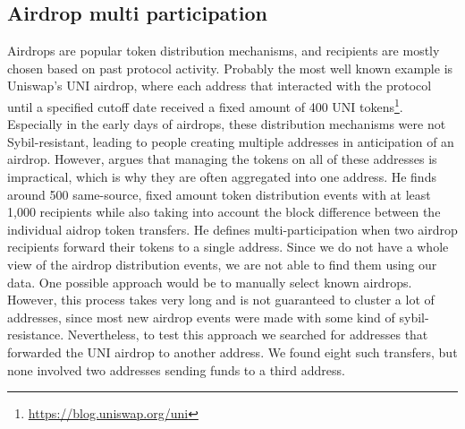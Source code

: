 \documentclass[12pt,a4paper,titlepage,oneside,english]{article}
\begin{document}
\subsection{Airdrop multi participation}
Airdrops are popular token distribution mechanisms, and recipients are mostly chosen based on past protocol activity. Probably the most well known example is Uniswap's UNI airdrop, where each address that interacted with the protocol until a specified cutoff date received a fixed amount of 400 UNI tokens\footnote{\url{https://blog.uniswap.org/uni}}. Especially in the early days of airdrops, these distribution mechanisms were not Sybil-resistant, leading to people creating multiple addresses in anticipation of an airdrop. However, \cite{FV:17} argues that managing the tokens on all of these addresses is impractical, which is why they are often aggregated into one address. He finds around 500 same-source, fixed amount token distribution events with at least 1,000 recipients while also taking into account the block difference between the individual aidrop token transfers. He defines multi-participation when two airdrop recipients forward their tokens to a single address. Since we do not have a whole view of the airdrop distribution events, we are not able to find them using our data. One possible approach would be to manually select known airdrops. However, this process takes very long and is not guaranteed to cluster a lot of addresses, since most new airdrop events were made with some kind of sybil-resistance. Nevertheless, to test this approach we searched for addresses that forwarded the UNI airdrop to another address. We found eight such transfers, but none involved two addresses sending funds to a third address.

\iffalse
Airdrops are a popular mechanism to distribute tokens. On the Ethereum blockchain, they are performed through smart contracts. The owners of the smart contract choose recipients either based on past activity, or ask users to sign up through online forms. Some of these registration processes require users to perform certain actions on social media, such as posting articles or following users. The amount of tokens given to each user is either fixed, or based on existing account balances. If the amount is fixed, there is an incentive to cheat the system. 
We identify Airdrops where a fixed number of tokens is distributed to many recipients. Then we search for addresses that have been forwarded the same amount from the initial recipients. 
This heuristic depends on two inputs. First, a set of aidrops with equal mounts, characterized by a signature of a distributing address, a token network and an amount. Second, the minimum nuber of token aggregations into a single address. The second parameter is trivial to choose, as multi-participation in its smallest form consist of two aidrop recipient addresses forwarding their tokens to a third adddress. In this case, a single entity would be in control of at least 3 addresses.
The main challenge lies in identying airdrops. To do so, we first examine all same-source, fixed amount token distributions.
\fi
\end{document}
